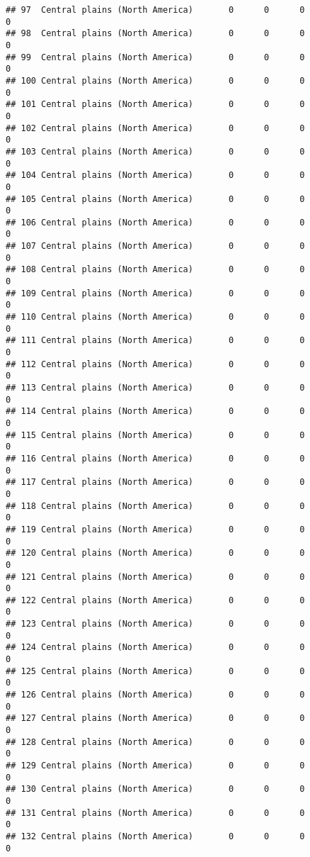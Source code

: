 \documentclass[]{article}
\begin{document}
\begin{verbatim}
## 97  Central plains (North America)       0      0      0             0
## 98  Central plains (North America)       0      0      0             0
## 99  Central plains (North America)       0      0      0             0
## 100 Central plains (North America)       0      0      0             0
## 101 Central plains (North America)       0      0      0             0
## 102 Central plains (North America)       0      0      0             0
## 103 Central plains (North America)       0      0      0             0
## 104 Central plains (North America)       0      0      0             0
## 105 Central plains (North America)       0      0      0             0
## 106 Central plains (North America)       0      0      0             0
## 107 Central plains (North America)       0      0      0             0
## 108 Central plains (North America)       0      0      0             0
## 109 Central plains (North America)       0      0      0             0
## 110 Central plains (North America)       0      0      0             0
## 111 Central plains (North America)       0      0      0             0
## 112 Central plains (North America)       0      0      0             0
## 113 Central plains (North America)       0      0      0             0
## 114 Central plains (North America)       0      0      0             0
## 115 Central plains (North America)       0      0      0             0
## 116 Central plains (North America)       0      0      0             0
## 117 Central plains (North America)       0      0      0             0
## 118 Central plains (North America)       0      0      0             0
## 119 Central plains (North America)       0      0      0             0
## 120 Central plains (North America)       0      0      0             0
## 121 Central plains (North America)       0      0      0             0
## 122 Central plains (North America)       0      0      0             0
## 123 Central plains (North America)       0      0      0             0
## 124 Central plains (North America)       0      0      0             0
## 125 Central plains (North America)       0      0      0             0
## 126 Central plains (North America)       0      0      0             0
## 127 Central plains (North America)       0      0      0             0
## 128 Central plains (North America)       0      0      0             0
## 129 Central plains (North America)       0      0      0             0
## 130 Central plains (North America)       0      0      0             0
## 131 Central plains (North America)       0      0      0             0
## 132 Central plains (North America)       0      0      0             0

\end{verbatim}
\end{document}
